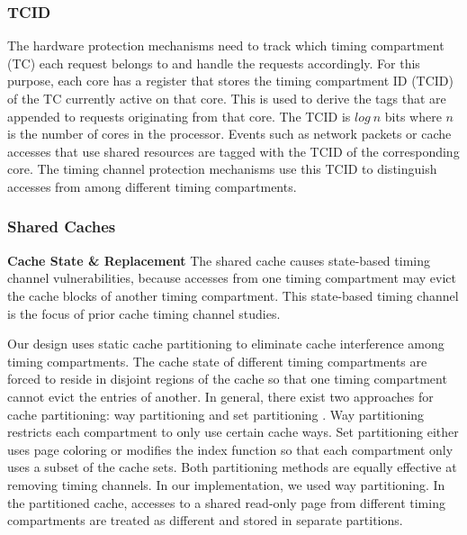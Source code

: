 \subsubsection{TCID}

The hardware protection mechanisms need to track which timing compartment (TC)
each request belongs to and handle the requests accordingly. 
For this purpose, each core has a register that 
stores the timing compartment ID (TCID) of the TC currently active on that 
core. This is used to derive the tags that are appended to requests originating 
from that core. The TCID is $log\ n$ bits where $n$ is the number of cores in 
the processor.
Events such as network packets or cache accesses that use shared resources are 
tagged with the TCID of the corresponding core.  The timing channel protection 
mechanisms use this TCID to distinguish accesses
from among different timing compartments.

\subsubsection{Shared Caches}
\textbf{Cache State \& Replacement}
The shared cache causes state-based timing channel vulnerabilities, because 
accesses from one timing compartment may evict the cache blocks of another
timing compartment. This state-based timing channel is the focus of prior
cache timing channel studies.

Our design uses static cache partitioning to eliminate cache
interference among timing compartments.
The cache state of different timing compartments are forced to reside in 
disjoint regions of the cache so that one timing compartment cannot evict the 
entries of another.
In general, there exist two approaches for cache partitioning:
way partitioning \cite{dynamic_partitioning} and
set partitioning \cite{rtas_cache_framework}. Way partitioning restricts
each compartment to only use certain cache ways. Set partitioning
either uses page coloring or modifies the index function so that each 
compartment
only uses a subset of the cache sets. Both partitioning methods are equally
effective at removing timing channels. In our implementation, we used way 
partitioning.
In the partitioned cache, accesses to a shared read-only page from different
timing compartments are treated as different and stored in separate partitions.


